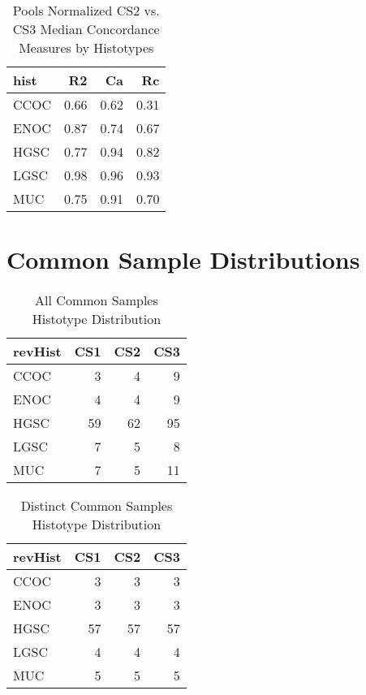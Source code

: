 \documentclass[
]{report}
\begin{document}
\begin{table}

\caption{\label{tab:pools-cs2norm-vs-cs3}Pools Normalized CS2 vs. CS3 Median Concordance Measures by Histotypes}
\centering
\begin{tabular}[t]{l|r|r|r}
\hline
hist & R2 & Ca & Rc\\
\hline
CCOC & 0.66 & 0.62 & 0.31\\
\hline
ENOC & 0.87 & 0.74 & 0.67\\
\hline
HGSC & 0.77 & 0.94 & 0.82\\
\hline
LGSC & 0.98 & 0.96 & 0.93\\
\hline
MUC & 0.75 & 0.91 & 0.70\\
\hline
\end{tabular}
\end{table}

\hypertarget{common-sample-distributions}{%
\section{Common Sample Distributions}\label{common-sample-distributions}}

\begin{table}

\caption{\label{tab:common-dist-all}All Common Samples Histotype Distribution}
\centering
\begin{tabular}[t]{l|r|r|r}
\hline
revHist & CS1 & CS2 & CS3\\
\hline
CCOC & 3 & 4 & 9\\
\hline
ENOC & 4 & 4 & 9\\
\hline
HGSC & 59 & 62 & 95\\
\hline
LGSC & 7 & 5 & 8\\
\hline
MUC & 7 & 5 & 11\\
\hline
\end{tabular}
\end{table}

\begin{table}

\caption{\label{tab:common-dist-distinct}Distinct Common Samples Histotype Distribution}
\centering
\begin{tabular}[t]{l|r|r|r}
\hline
revHist & CS1 & CS2 & CS3\\
\hline
CCOC & 3 & 3 & 3\\
\hline
ENOC & 3 & 3 & 3\\
\hline
HGSC & 57 & 57 & 57\\
\hline
LGSC & 4 & 4 & 4\\
\hline
MUC & 5 & 5 & 5\\
\hline
\end{tabular}
\end{table}
\end{document}
